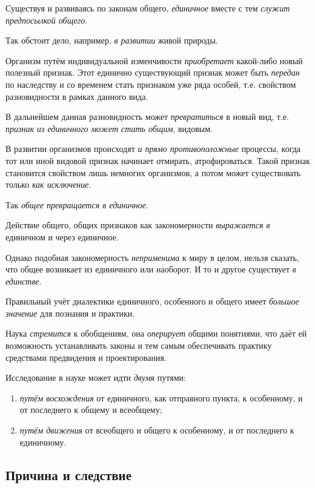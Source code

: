 \documentclass[a4paper,14pt,russian]{extreport}
\begin{document}
Существуя и развиваясь по законам общего, \emph{единичное} вместе с тем \emph{служит предпосылкой общего}.

Так обстоит дело, например, \emph{в развитии} живой природы.

Организм путём индивидуальной изменчивости \emph{приобретает} какой-либо новый полезный признак. Этот единично существующий признак может быть \emph{передан} по наследству и со временем стать признаком уже ряда особей, т.е. свойством разновидности в рамках данного вида.

В дальнейшем данная разновидность может \emph{превратиться} в новый вид, т.е. \emph{признак из единичного может стать общим}, видовым.

В развитии организмов происходят \emph{и прямо противоположные} процессы, когда тот или иной видовой признак начинает отмирать, атрофироваться. Такой признак становится свойством лишь немногих организмов, а потом может существовать только \emph{как исключение}.

Так \emph{общее превращается в единичное}.

Действие общего, общих признаков как закономерности \emph{выражается в} единичном и через единичное.

Однако подобная закономерность \emph{неприменима} к миру в целом, нельзя сказать, что общее возникает из единичного или наоборот. И то и другое существует \emph{в единстве}.

Правильный учёт диалектики единичного, особенного и общего имеет \emph{большое значение} для познания и практики.

Наука \emph{стремится} к обобщениям, она \emph{оперирует} общими понятиями, что даёт ей возможность устанавливать законы и тем самым обеспечивать практику средствами предвидения и проектирования.

Исследование в науке может идти \emph{двумя} путями:

\begin{enumerate}
\item \emph{путём восхождения} от единичного, как отправного пункта, к особенному, и от последнего к общему и всеобщему;
\item \emph{путём движения} от всеобщего и общего к особенному, и от последнего к единичному.
\end{enumerate}

\subsection{Причина и следствие}
\end{document}
